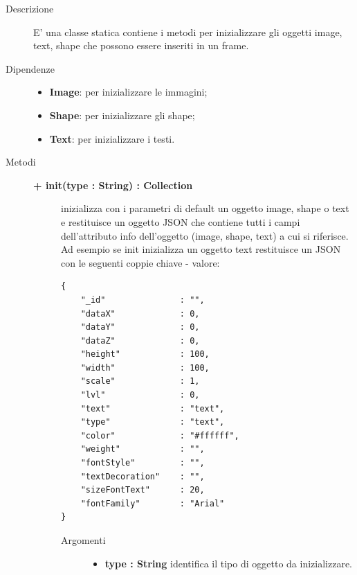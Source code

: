 \begin{description}
\item[Descrizione] \hfill
	E' una classe statica contiene i metodi per inizializzare gli oggetti image, text, shape che possono essere inseriti in un frame.
	
	\item[Dipendenze] \hfill
	\begin{itemize}
		\item \textbf{Image}: per inizializzare le immagini;
		\item \textbf{Shape}: per inizializzare gli shape;
		\item \textbf{Text}: per inizializzare i testi.
	\end{itemize}
	
\item[Metodi] \hfill

	\begin{description}
		\item[\textbf{\color{blue}+ init(type : String) : Collection			}] \hfill
			inizializza con i parametri di default un oggetto image, shape o text e restituisce un oggetto JSON che contiene tutti i campi dell'attributo info dell'oggetto (image, shape, text) a cui si riferisce. Ad esempio se init inizializza un oggetto text restituisce un JSON con le seguenti coppie chiave - valore:
\begin{lstlisting}
{
    "_id"               : "",
    "dataX"             : 0,
    "dataY"             : 0,
    "dataZ"             : 0,
    "height"            : 100,
    "width"             : 100,
    "scale"             : 1,
    "lvl"               : 0,
    "text"              : "text",
    "type"              : "text",
    "color"             : "#ffffff",
    "weight"            : "",
    "fontStyle"         : "",
    "textDecoration"    : "",
    "sizeFontText"      : 20,
    "fontFamily"        : "Arial"
}
\end{lstlisting}
			
		\begin{description}
			\item[Argomenti] \hfill
				\begin{itemize}
				
					\item \textbf{type : String			} \hfill
					identifica il tipo di oggetto da inizializzare.
				\end{itemize}
		\end{description}


\end{description}
\end{description}
